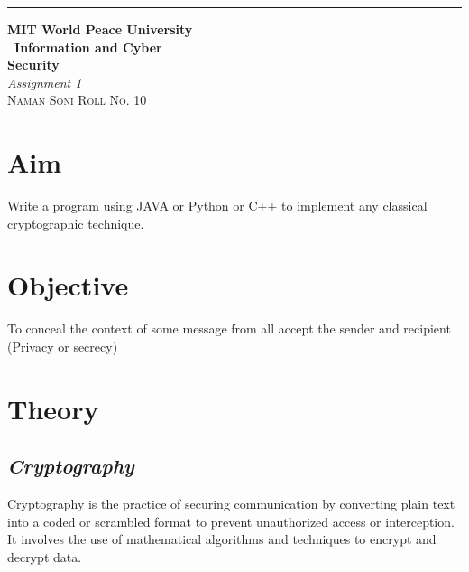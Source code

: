 \documentclass{article}
\begin{document}
\begin{titlepage} %
	
	\raggedleft\rule{1pt}{\textheight} %
	\hspace{0.05\textwidth} %
	\parbox[b]{0.75\textwidth}
	{ %
		
		{\Huge\bfseries MIT World Peace University \\[0.5\baselineskip] \ Information and Cyber \\ Security}\\[2\baselineskip] %
		{\large\textit{Assignment 1}}\\[4\baselineskip] %
		{\Large\textsc{Naman Soni Roll No. 10}} %
		
		\vspace{0.5\textheight} %
	}
	
\end{titlepage}
\tableofcontents
\pagebreak
\section{\textbf{Aim}}
Write a program using JAVA or Python or C++ to implement any classical cryptographic technique.
\section{\textbf{Objective}}
To conceal the context of some message from all accept the sender and recipient (Privacy or secrecy)
\section{\textbf{Theory}}
\subsection{\textbf{\textit{Cryptography}}}
Cryptography is the practice of securing communication by converting plain text into a coded or scrambled format to prevent unauthorized access or interception. It involves the use of mathematical algorithms and techniques to encrypt and decrypt data.\\
\end{document}
